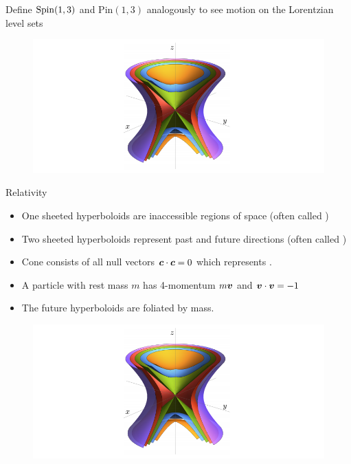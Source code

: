 \documentclass[aspectratio=169]{beamer}
\begin{document}
\begin{frame}{}
\vfill
\centering Define $\mathrm{Spin}(1,3)$ and $\mathrm{Pin}(1,3)$ analogously to see motion on the Lorentzian level sets
\begin{figure}[H]
\centering
\includegraphics[width=.8\textwidth]{figures/lorentzian.png}
\end{figure}
\end{frame}

\begin{frame}{Relativity}
\vfill
\begin{itemize}
	\item One sheeted hyperboloids are inaccessible regions of space (often called )
	\item Two sheeted hyperboloids represent past and future directions (often called )
	\item Cone consists of all null vectors $\boldsymbol{c}\cdot \boldsymbol{c} = 0$ which represents .
	\item A particle with rest mass $m$ has 4-momentum $m\boldsymbol{v}$ and $\boldsymbol{v}\cdot \boldsymbol{v}=-1$
	\item The future hyperboloids are foliated by mass.
\end{itemize}
\begin{figure}[H]
\centering
\includegraphics[width=.8\textwidth]{figures/lorentzian.png}
\end{figure}
\vfill
\end{frame}
\end{document}
